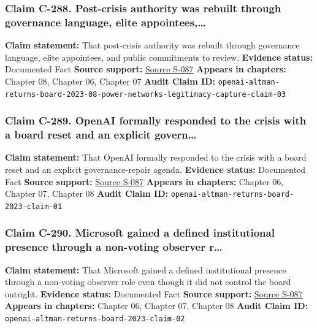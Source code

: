 \documentclass[
  american,
  11pt,
  letterpaper,
]{article}
\begin{document}
\subsubsection{Claim C-288. Post-crisis authority was rebuilt through
governance language, elite
appointees,\ldots{}}\label{claim-c-288-post-crisis-authority-was-rebuilt-through-governance-language-elite-appointees}

\textbf{Claim statement:} That post-crisis authority was rebuilt through
governance language, elite appointees, and public commitments to review.
\textbf{Evidence status:} Documented Fact \textbf{Source support:}
\hyperref[source-s-087-sam-altman-returns-as-ceo-openai-has-a-new-initial-board]{Source
S-087} \textbf{Appears in chapters:} Chapter 08, Chapter 06, Chapter 07
\textbf{Audit Claim ID:}
\texttt{openai-altman-returns-board-2023-08-power-networks-legitimacy-capture-claim-03}

\subsubsection{Claim C-289. OpenAI formally responded to the crisis with
a board reset and an explicit
govern\ldots{}}\label{claim-c-289-openai-formally-responded-to-the-crisis-with-a-board-reset-and-an-explicit-govern}

\textbf{Claim statement:} That OpenAI formally responded to the crisis
with a board reset and an explicit governance-repair agenda.
\textbf{Evidence status:} Documented Fact \textbf{Source support:}
\hyperref[source-s-087-sam-altman-returns-as-ceo-openai-has-a-new-initial-board]{Source
S-087} \textbf{Appears in chapters:} Chapter 06, Chapter 07, Chapter 08
\textbf{Audit Claim ID:}
\texttt{openai-altman-returns-board-2023-claim-01}

\subsubsection{Claim C-290. Microsoft gained a defined institutional
presence through a non-voting observer
r\ldots{}}\label{claim-c-290-microsoft-gained-a-defined-institutional-presence-through-a-non-voting-observer-r}

\textbf{Claim statement:} That Microsoft gained a defined institutional
presence through a non-voting observer role even though it did not
control the board outright. \textbf{Evidence status:} Documented Fact
\textbf{Source support:}
\hyperref[source-s-087-sam-altman-returns-as-ceo-openai-has-a-new-initial-board]{Source
S-087} \textbf{Appears in chapters:} Chapter 06, Chapter 07, Chapter 08
\textbf{Audit Claim ID:}
\texttt{openai-altman-returns-board-2023-claim-02}
\end{document}

